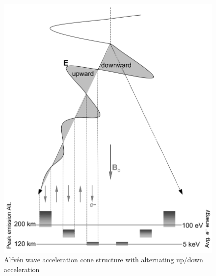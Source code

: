 \begin{figure}
	\includegraphics[width=0.9\linewidth]{gfx/alfven_cone}
	\caption{Alfvén wave acceleration cone structure with alternating up/down acceleration \citep{semeter2008}}\label{fig:alfvencone}
\end{figure}

